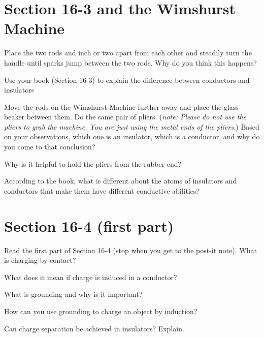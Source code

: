 \documentclass[10pt]{exam}
\begin{document}
\pagebreak

\section{Section 16-3 and the Wimshurst Machine}

\begin{questions}
  \question
    Place the two rods and inch or two apart from each other and steadily turn the handle until sparks jump between the two rods.  Why do you think this happens? \vs

  \question 
    Use your book (Section 16-3) to explain the difference between conductors and insulators\vs 
    
  \question 
    Move the rods on the Wimshurst Machine further away and place the glass beaker between them.  Do the same pair of pliers. (\emph{note: Please do not use the pliers to grab the machine.  You are just using the metal ends of the pliers.})  Based on your observations, which one is an insulator, which is a conductor, and why do you come to that conclusion? \vs 

  \question 
    Why is it helpful to hold the pliers from the rubber end? \vs 

  \question 
    According to the book, what is different about the atoms of insulators and conductors that make them have different conductive abilities?\vs 

\end{questions}

\section{Section 16-4 (first part)} \label{16-4}

\begin{questions}
  \question 
    Read the first part of Section 16-4 (stop when you get to the post-it note).  What is charging by contact? \vs

  \question 
    What does it mean if charge is induced in a conductor? \vs
  
  \question 
    What is grounding and why is it important? \vs
  
  \question 
    How can you use grounding to charge an object by induction? \vs
  
  \question 
    Can charge separation be achieved in insulators?  Explain. \vs
    
\end{questions}
\end{document}
